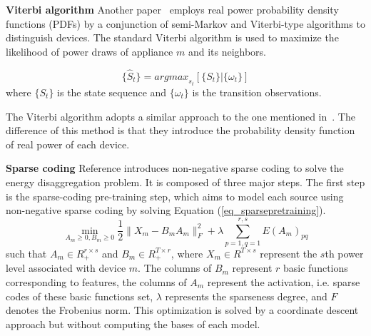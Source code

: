 \textbf{Viterbi algorithm}
Another paper~\cite{zeifman2012disaggregation} 
employs real power probability density functions (PDFs) by a conjunction of semi-Markov and Viterbi-type algorithms to distinguish devices. %
The standard Viterbi algorithm is used to maximize the likelihood of power
draws of appliance $m$ and its neighbors. 


\begin{equation}
\{\hat{S}_t \} = {argmax}_{s_t}[\{S_t\}|\{\omega_t\}]
\end{equation}
where $\{S_t\}$ is the state sequence and
$\{\omega_t\}$ is the transition observations.

The Viterbi algorithm adopts a similar approach to the one mentioned in~\cite{baranski2004genetic}.
The difference of this method is that they introduce the probability density function of real power of each device. 

\textbf{Sparse coding}
Reference \cite{kolter2010sparse} introduces non-negative sparse coding to solve the energy disaggregation problem. 
It is composed of three major steps. 
The first step is the sparse-coding pre-training step, which aims to 
model each source using non-negative sparse coding by solving 
Equation (\ref{eq_sparsepretraining}).
\begin{equation}
\min_{A_m\geq0,B_m\geq0}\frac{1}{2}\lVert X_m- B_mA_m\rVert_F^2 + \lambda\sum_{p=1,q=1}^{r,s}E(A_m)_{pq}
\label{eq_sparsepretraining}
\end{equation}
such that $A_m \in R_{+}^{r\times s} $ and
 $B_m \in R_{+}^{T\times r}$, 
where 
$X_m \in R^{T \times s}$ represent the $s$th power level associated with device $m$. 
The columns of $B_m$ represent $r$ basic functions corresponding to features, 
the columns of $A_m$ represent the activation, i.e. sparse codes of these basic functions set, 
$\lambda$ represents the sparseness degree, 
and $F$ denotes the Frobenius norm. 
This optimization is solved by a coordinate descent approach but without computing 
the bases of each model. 

